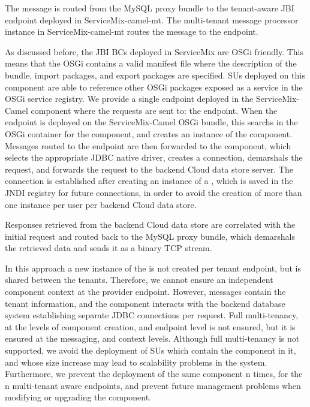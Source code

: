 The message is routed from the MySQL proxy bundle to the tenant-aware \ac{JBI} endpoint deployed in ServiceMix-camel-mt. The multi-tenant message processor instance in ServiceMix-camel-mt routes the message to the  endpoint. 

As discussed before, the \ac{JBI} \ac{BC}s deployed in ServiceMix are \ac{OSGi} friendly. This means that the \ac{OSGi} contains a valid manifest file where the description of the bundle, import packages, and export packages are specified. \ac{SU}s deployed on this component are able to reference other \ac{OSGi} packages exposed as a service in the \ac{OSGi} service registry. We provide a single endpoint deployed in the ServiceMix-Camel component where the requests are sent to: the  endpoint. When the  endpoint is deployed on the ServiceMix-Camel \ac{OSGi} bundle, this searchs in the \ac{OSGi} container for the  component, and creates an instance of the component. Messages routed to the  endpoint are then forwarded to the  component, which selects the appropriate \ac{JDBC} native driver, creates a connection, demarshals the request, and forwards the request to the backend Cloud data store server. The connection is established after creating an instance of a , which is saved in the \ac{JNDI} registry for future connections, in order to avoid the creation of more than one  instance per user per backend Cloud data store.

Responses retrieved from the backend Cloud data store are correlated with the initial request and routed back to the MySQL proxy bundle, which demarshals the retrieved data and sends it as a binary \ac{TCP} stream.

In this approach a new instance of the  is not created per tenant endpoint, but is shared between the tenants. Therefore, we cannot ensure an independent component context at the provider endpoint. However, messages contain the tenant information, and the  component interacts with the backend database system establishing separate \ac{JDBC} connections per request. Full multi-tenancy, at the levels of component creation, and endpoint level is not ensured, but it is ensured at the messaging, and context levels. Although full multi-tenancy is not supported, we avoid the deployment of \ac{SU}s which contain the  component in it, and whose size increase may lead to scalability problems in the system. Furthermore, we prevent the deployment of the same component n times, for the n multi-tenant aware endpoints, and prevent future management problems when modifying or upgrading the  component. 

\FloatBarrier


